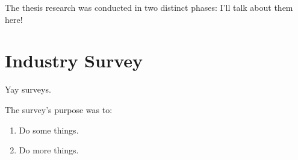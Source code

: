 
The thesis research was conducted in two distinct phases: I'll talk about them here!

\section{Industry Survey}
\label{sec:industry_survey}

Yay surveys.
\par
\medskip
The survey's purpose was to:

\begin{enumerate}

\item Do some things.

\item Do more things.

\end{enumerate}
